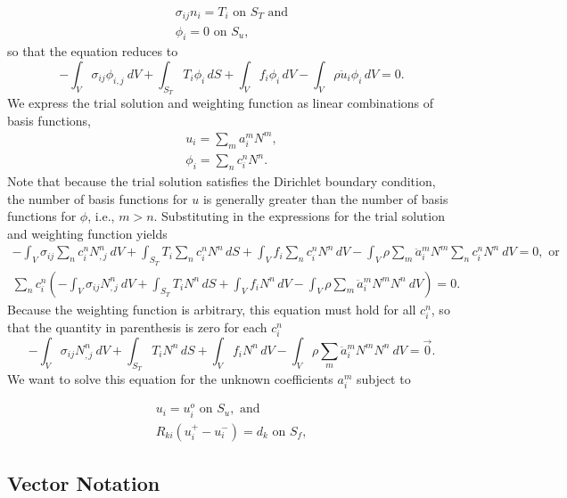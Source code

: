 \begin{gather}
\sigma_{ij}n_{i}=T_{i}\text{ on }S_{T}\text{ and}\\
\phi_{i}=0\text{ on }S_{u},
\end{gather}
so that the equation reduces to
\begin{equation}
-\int_{V}\sigma_{ij}\phi_{i,j}\: dV+\int_{S_{T}}T_{i}\phi_{i}\, dS+\int_{V}f_{i}\phi_{i}\, dV-\int_{V}\rho\ddot{u}_{i}\phi_{i}\, dV=0.\label{eq:elasticity:integral}
\end{equation}
We express the trial solution and weighting function as linear combinations
of basis functions,
\begin{gather}
u_{i}=\sum_{m}a_{i}^{m}N^{m},\\
\phi_{i}=\sum_{n}c_{i}^{n}N^{n}.
\end{gather}
Note that because the trial solution satisfies the Dirichlet boundary
condition, the number of basis functions for $u$ is generally greater
than the number of basis functions for $\phi$, i.e., $m>n$. Substituting
in the expressions for the trial solution and weighting function yields
\begin{gather}
-\int_{V}\sigma_{ij}\sum_{n}c_{i}^{n}N_{,j}^{n}\: dV+\int_{S_{T}}T_{i}\sum_{n}c_{i}^{n}N^{n}\, dS+\int_{V}f_{i}\sum_{n}c_{i}^{n}N^{n}\, dV-\int_{V}\rho\sum_{m}\ddot{a}_{i}^{m}N^{m}\sum_{n}c_{i}^{n}N^{n}\ dV=0,\text{ or}\\
\sum_{n}c_{i}^{n}(-\int_{V}\sigma_{ij}N_{,j}^{n}\: dV+\int_{S_{T}}T_{i}N^{n}\, dS+\int_{V}f_{i}N^{n}\, dV-\int_{V}\rho\sum_{m}\ddot{a}_{i}^{m}N^{m}N^{n}\ dV)=0.
\end{gather}
 Because the weighting function is arbitrary, this equation must hold
for all $c_{i}^{n}$, so that the quantity in parenthesis is zero
for each $c_{i}^{n}$
\begin{equation}
-\int_{V}\sigma_{ij}N_{,j}^{n}\: dV+\int_{S_{T}}T_{i}N^{n}\, dS+\int_{V}f_{i}N^{n}\, dV-\int_{V}\rho\sum_{m}\ddot{a}_{i}^{m}N^{m}N^{n}\ dV=\vec{0}.\label{eq:elasticity:integral:discretized}
\end{equation}
We want to solve this equation for the unknown coefficients $a_{i}^{m}$
subject to

\begin{gather}
u_{i}=u_{i}^{o}\text{ on }S_{u},\text{ and}\\
R_{ki}(u_{i}^{+}-u_{i}^{-})=d_{k}\text{ on }S_{f},
\end{gather}



\subsection{Vector Notation}


